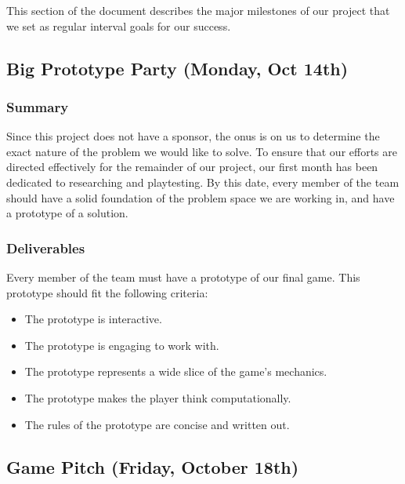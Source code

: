 This section of the document describes the major milestones of our project that we set
as regular interval goals for our success.

\subsection{Big Prototype Party (Monday, Oct 14th)}

\subsubsection*{Summary}
Since this project does not have a sponsor, the onus is on us to determine the
exact nature of the problem we would like to solve. To ensure that our efforts
are directed effectively for the remainder of our project, our first month has
been dedicated to researching and playtesting. By this date, every member of the
team should have a solid foundation of the problem space we are working in, and
have a prototype of a solution.

\subsubsection*{Deliverables}
Every member of the team must have a prototype of our final game. This prototype
should fit the following criteria:
\begin{itemize}
	\item The prototype is interactive.
	\item The prototype is engaging to work with.
	\item The prototype represents a wide slice of the game’s mechanics.
	\item The prototype makes the player think computationally.
	\item The rules of the prototype are concise and written out.
\end{itemize}

\subsection{Game Pitch (Friday, October 18th)}

